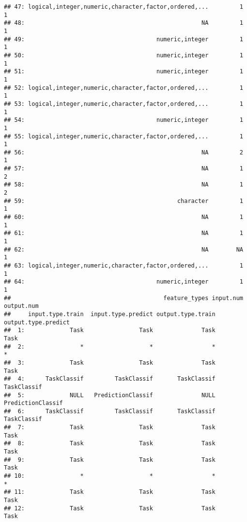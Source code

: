 \documentclass[
]{scrbook}
\begin{document}
\begin{verbatim}
## 47: logical,integer,numeric,character,factor,ordered,...         1          1
## 48:                                                   NA         1          1
## 49:                                      numeric,integer         1          1
## 50:                                      numeric,integer         1          1
## 51:                                      numeric,integer         1          1
## 52: logical,integer,numeric,character,factor,ordered,...         1          1
## 53: logical,integer,numeric,character,factor,ordered,...         1          1
## 54:                                      numeric,integer         1          1
## 55: logical,integer,numeric,character,factor,ordered,...         1          1
## 56:                                                   NA         2          1
## 57:                                                   NA         1          2
## 58:                                                   NA         1          2
## 59:                                            character         1          1
## 60:                                                   NA         1          1
## 61:                                                   NA         1          1
## 62:                                                   NA        NA          1
## 63: logical,integer,numeric,character,factor,ordered,...         1          1
## 64:                                      numeric,integer         1          1
##                                            feature_types input.num output.num
##     input.type.train  input.type.predict output.type.train output.type.predict
##  1:             Task                Task              Task                Task
##  2:                *                   *                 *                   *
##  3:             Task                Task              Task                Task
##  4:      TaskClassif         TaskClassif       TaskClassif         TaskClassif
##  5:             NULL   PredictionClassif              NULL   PredictionClassif
##  6:      TaskClassif         TaskClassif       TaskClassif         TaskClassif
##  7:             Task                Task              Task                Task
##  8:             Task                Task              Task                Task
##  9:             Task                Task              Task                Task
## 10:                *                   *                 *                   *
## 11:             Task                Task              Task                Task
## 12:             Task                Task              Task                Task

\end{verbatim}
\end{document}
